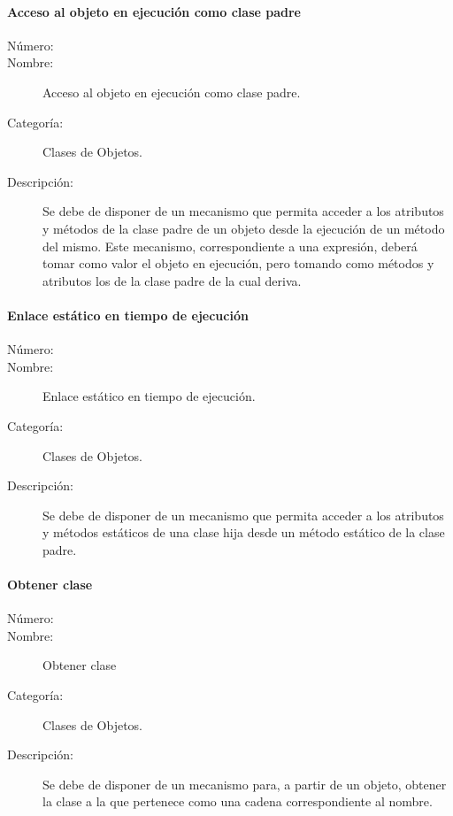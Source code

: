 \paragraph{Acceso al objeto en ejecución como clase padre}
\begin{framed}
	\begin{description}
		\item [Número:] \cn
		\item [Nombre:] Acceso al objeto en ejecución como clase padre.
		\item [Categoría:] Clases de Objetos.
		\item [Descripción:] Se debe de disponer de un mecanismo que permita acceder a los atributos y métodos de la clase padre de un objeto desde 
      la ejecución de un método del mismo. Este mecanismo, correspondiente a una expresión, deberá tomar como valor el objeto en ejecución, pero tomando
      como métodos y atributos los de la clase padre de la cual deriva. 
	\end{description}
\end{framed}

\paragraph{Enlace estático en tiempo de ejecución}
\begin{framed}
	\begin{description}
		\item [Número:] \cn
		\item [Nombre:] Enlace estático en tiempo de ejecución.
		\item [Categoría:] Clases de Objetos.
		\item [Descripción:] Se debe de disponer de un mecanismo que permita acceder a los atributos y métodos estáticos de una clase hija desde un método 
      estático de la clase padre. 
	\end{description}
\end{framed}

\paragraph{Obtener clase}
\begin{framed}
	\begin{description}
		\item [Número:] \cn
		\item [Nombre:] Obtener clase
		\item [Categoría:] Clases de Objetos.
		\item [Descripción:] Se debe de disponer de un mecanismo para, a partir de un objeto, obtener la clase a la que pertenece como una cadena correspondiente al nombre.
	\end{description}
\end{framed}


